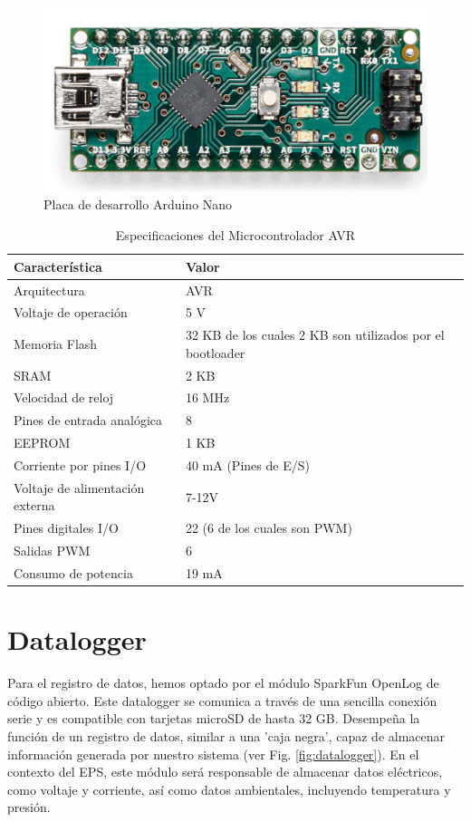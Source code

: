 \begin{figure}[hb!]
  \centering
  \includegraphics[width=0.4\linewidth]{Pictures/ArduinoNano.png} 
  \caption{Placa de desarrollo Arduino Nano}
  \label{fig:arduinoNanoBoard}
\end{figure}

\begin{table}[b]
\centering
\caption{Especificaciones del Microcontrolador AVR}
\label{tab:nanotable}
\begin{tabular}{l l}
\toprule %
Característica & Valor \\
\midrule %
Arquitectura & AVR \\
Voltaje de operación & 5 V \\
Memoria Flash & 32 KB de los cuales 2 KB son utilizados por el bootloader \\
SRAM & 2 KB \\
Velocidad de reloj & 16 MHz \\
Pines de entrada analógica & 8 \\
EEPROM & 1 KB \\
Corriente por pines I/O  & 40 mA (Pines de E/S) \\
Voltaje de alimentación externa & 7-12V \\
Pines digitales I/O & 22 (6 de los cuales son PWM) \\
Salidas PWM  & 6 \\
Consumo de potencia & 19 mA \\
\bottomrule %
\end{tabular}
\end{table}

\newpage

\section{Datalogger}
Para el registro de datos, hemos optado por el módulo SparkFun OpenLog de código abierto. Este datalogger se comunica a través de una sencilla conexión serie y es compatible con tarjetas microSD de hasta 32 GB. Desempeña la función de un registro de datos, similar a una 'caja negra', capaz de almacenar información generada por nuestro sistema (ver Fig. \ref{fig:datalogger}). En el contexto del EPS, este módulo será responsable de almacenar datos eléctricos, como voltaje y corriente, así como datos ambientales, incluyendo temperatura y presión.

